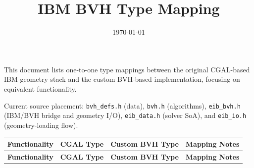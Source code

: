 \documentclass[11pt,a4paper]{article}
\title{IBM BVH Type Mapping}
\author{}
\date{\today}
\begin{document}
\maketitle

This document lists one-to-one type mappings between the original CGAL-based IBM geometry stack and the custom BVH-based implementation, focusing on equivalent functionality.

Current source placement: \texttt{bvh\_defs.h} (data), \texttt{bvh.h} (algorithms), \texttt{eib\_bvh.h} (IBM/BVH bridge and geometry I/O), \texttt{eib\_data.h} (solver SoA), and \texttt{eib\_io.h} (geometry-loading flow).

\renewcommand{\arraystretch}{1.2}
\setlength{\tabcolsep}{6pt}

\begin{longtable}{p{} p{} p{} p{}}
\toprule
\textbf{Functionality} & \textbf{CGAL Type} & \textbf{Custom BVH Type} & \textbf{Mapping Notes} \\
\midrule
\endfirsthead

\toprule
\textbf{Functionality} & \textbf{CGAL Type} & \textbf{Custom BVH Type} & \textbf{Mapping Notes} \\
\midrule
\endhead


\end{longtable}
\end{document}
